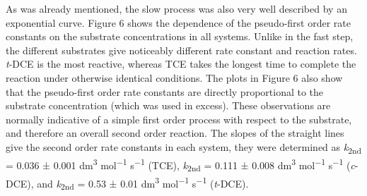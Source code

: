 \documentclass{article}
\begin{document}
As was already mentioned, the slow process was also very well described by an exponential curve. Figure 6 shows the dependence of the pseudo-first order rate constants on the substrate concentrations in all systems. Unlike in the fast step, the different substrates give noticeably different rate constant and reaction rates. \emph{t}-DCE is the most reactive, whereas TCE takes the longest time to complete the reaction under otherwise identical conditions. The plots in Figure 6 also show that the pseudo-first order rate constants are directly proportional to the substrate concentration (which was used in excess). These observations are normally indicative of a simple first order process with respect to the substrate, and therefore an overall second order reaction. The slopes of the straight lines give the second order rate constants in each system, they were determined as \emph{k}\textsubscript{2nd} = 0.036 ± 0.001 dm\textsuperscript{3} mol\textsuperscript{−1} s\textsuperscript{−1} (TCE), \emph{k}\textsubscript{2nd} = 0.111 ± 0.008 dm\textsuperscript{3} mol\textsuperscript{−1} s\textsuperscript{−1} (\emph{c}-DCE), and \emph{k}\textsubscript{2nd} = 0.53 ± 0.01 dm\textsuperscript{3} mol\textsuperscript{−1} s\textsuperscript{−1} (\emph{t}-DCE).
\end{document}
